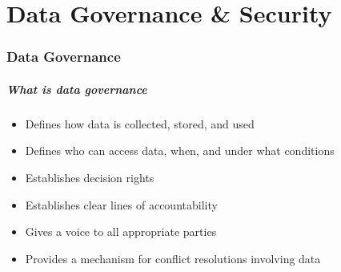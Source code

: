 \part{Data Governance \& Security}
\begin{frame}
			 \partpage
\end{frame}

\section[Data Governance]{Data Governance}

\begin{frame}
  \frametitle{What is data governance}
  \begin{itemize}
  \item Defines how data is collected, stored, and used
  \item Defines who can access data, when, and under what conditions
  \item Establishes decision rights
  \item Establishes clear lines of accountability
  \item Gives a voice to all appropriate parties
  \item Provides a mechanism for conflict resolutions involving data
  \end{itemize}
\end{frame}


